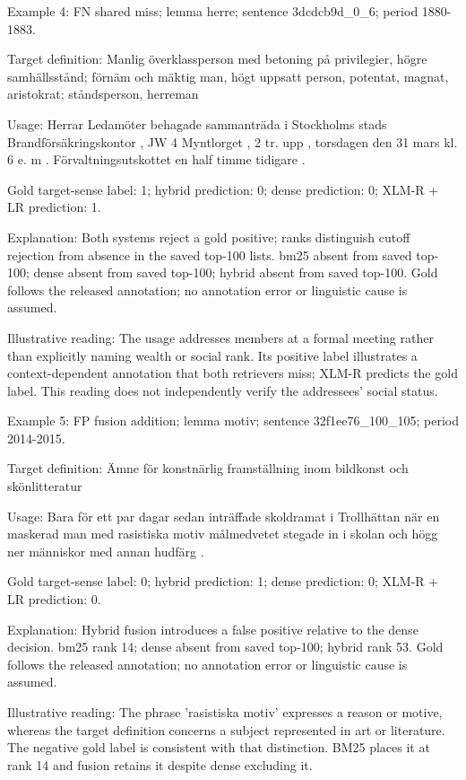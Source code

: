 Example 4: FN shared miss; lemma herre; sentence 3dcdcb9d\_0\_6; period 1880-1883.

Target definition: Manlig överklassperson med betoning på privilegier, högre samhällsstånd; förnäm och mäktig man, högt uppsatt person, potentat, magnat, aristokrat; ståndsperson, herreman

Usage: Herrar Ledamöter behagade sammanträda i Stockholms stads Brandförsäkringskontor , JW 4 Myntlorget , 2 tr. upp , torsdagen den 31 mars kl. 6 e. m . Förvaltningsutskottet en half timme tidigare .

Gold target-sense label: 1; hybrid prediction: 0; dense prediction: 0; XLM-R + LR prediction: 1.

Explanation: Both systems reject a gold positive; ranks distinguish cutoff rejection from absence in the saved top-100 lists. bm25 absent from saved top-100; dense absent from saved top-100; hybrid absent from saved top-100. Gold follows the released annotation; no annotation error or linguistic cause is assumed.

Illustrative reading: The usage addresses members at a formal meeting rather than explicitly naming wealth or social rank. Its positive label illustrates a context-dependent annotation that both retrievers miss; XLM-R predicts the gold label. This reading does not independently verify the addressees' social status.

Example 5: FP fusion addition; lemma motiv; sentence 32f1ee76\_100\_105; period 2014-2015.

Target definition: Ämne för konstnärlig fram\-ställning in\-om bild\-konst och skönlitteratur

Usage: Bara för ett par dagar sedan inträffade skoldramat i Trollhättan när en maskerad man med rasistiska motiv målmedvetet stegade in i skolan och högg ner människor med annan hudfärg .

Gold target-sense label: 0; hybrid prediction: 1; dense prediction: 0; XLM-R + LR prediction: 0.

Explanation: Hybrid fusion introduces a false positive relative to the dense decision. bm25 rank 14; dense absent from saved top-100; hybrid rank 53. Gold follows the released annotation; no annotation error or linguistic cause is assumed.

Illustrative reading: The phrase 'rasistiska motiv' expresses a reason or motive, whereas the target definition concerns a subject represented in art or literature. The negative gold label is consistent with that distinction. BM25 places it at rank 14 and fusion retains it despite dense excluding it.

